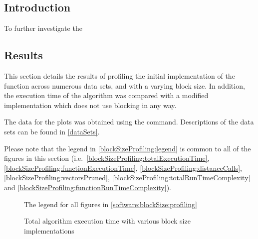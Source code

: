 \subsection{Introduction}
\label{software:blockSize:introduction}
To further investigate the

\subsection{Results}
\label{software:blockSize:profiling}
This section details the results of profiling the initial 
implementation of the  function across
numerous data sets, and with a varying block size. In addition, the execution
time of the algorithm was compared with a modified implementation which does not
use blocking in any way.

The data for the plots was obtained using the 
 command. Descriptions of the data sets can be found in
\autoref{dataSets}.


Please note that the legend in \autoref{blockSizeProfiling:legend} is common to
all of the figures in this section (i.e.\
\autoref{blockSizeProfiling:totalExecutionTime},
\autoref{blockSizeProfiling:functionExecutionTime},
\autoref{blockSizeProfiling:distanceCalls},
\autoref{blockSizeProfiling:vectorsPruned},
\autoref{blockSizeProfiling:totalRunTimeComplexity} and
\autoref{blockSizeProfiling:functionRunTimeComplexity}).

\begin{figure}
    \centering
    
    \caption[Block size profiling legend]
        {The legend for all figures in \autoref{software:blockSize:profiling}}
    \label{blockSizeProfiling:legend}
\end{figure}

\begin{figure}
    \centering
    
    \caption{Total algorithm execution time with various block size
        implementations}
    \label{blockSizeProfiling:totalExecutionTime}
\end{figure}

